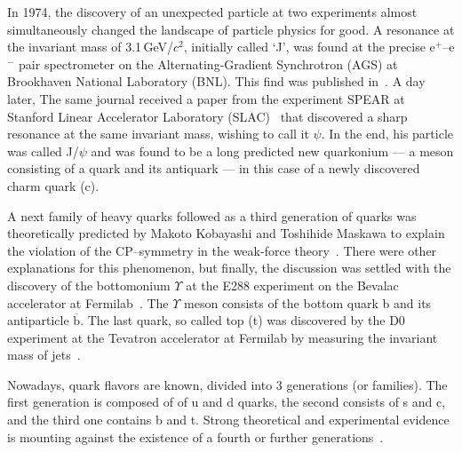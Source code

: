 In 1974, the discovery of an unexpected particle at two experiments almost simultaneously changed the landscape of particle physics for good. A resonance at the invariant mass of 3.1$\,$GeV/$c^2$, initially called `J', was found at the precise e$^+$--e$^-$ pair spectrometer on the Alternating-Gradient Synchrotron (AGS) at Brookhaven National Laboratory (BNL)\@. This find was published in~\cite{JpsiBNL}. A day later, The same journal received a paper from the experiment SPEAR at Stanford Linear Accelerator Laboratory (SLAC)~\cite{JpsiSLAC} that discovered a sharp resonance at the same invariant mass, wishing to call it $\psi$\@. In the end, his particle was called J/$\psi$ and was found to be a long predicted new quarkonium --- a meson consisting of a quark and its antiquark --- in this case of a newly discovered charm quark (c)\@.

A next family of heavy quarks followed as a third generation of quarks was theoretically predicted by Makoto Kobayashi and Toshihide Maskawa to explain the violation of the CP--symmetry in the weak-force theory~\cite{KobayashiMaskawa}\@. There were other explanations for this phenomenon, but finally, the discussion was settled with the discovery of the bottomonium $\Upsilon$ at the E288 experiment on the Bevalac accelerator at Fermilab~\cite{bottomDiscovery}\@. The $\Upsilon$ meson consists of the bottom quark b and its antiparticle $\overline{\mathrm{b}}$\@. The last quark, so called top (t) was discovered by the D0 experiment at the Tevatron accelerator at Fermilab by measuring the invariant mass of jets~\cite{topQuark}. 

Nowadays, quark flavors are known, divided into 3 generations (or families)\@. The first generation is composed of of u and d quarks, the second consists of s and c, and the third one contains b and t. Strong theoretical and experimental evidence is mounting against the existence of a fourth or further generations~\cite{fourGensPhysLettB,fourGensPRL}.

